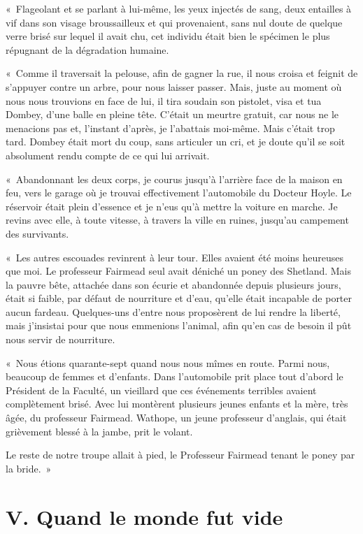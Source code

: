 \documentclass[french,twoside]{book} %
\newcommand\chapteropen{} %
\newcommand\chapterclose{} %
\begin{document}
« Flageolant et se parlant à lui-même, les yeux injectés de sang, deux entailles à vif dans son visage broussailleux et qui provenaient, sans nul doute de quelque verre brisé sur lequel il avait chu, cet individu était bien le spécimen le plus répugnant de la dégradation humaine.\par
« Comme il traversait la pelouse, afin de gagner la rue, il nous croisa et feignit de s’appuyer contre un arbre, pour nous laisser passer. Mais, juste au moment où nous nous trouvions en face de lui, il tira soudain son pistolet, visa et tua Dombey, d’une balle en pleine tête. C’était un meurtre gratuit, car nous ne le menacions pas et, l’instant d’après, je l’abattais moi-même. Mais c’était trop tard. Dombey était mort du coup, sans articuler un cri, et je doute qu’il se soit absolument rendu compte de ce qui lui arrivait.\par
« Abandonnant les deux corps, je courus jusqu’à l’arrière face de la maison en feu, vers le garage où je trouvai effectivement l’automobile du Docteur Hoyle. Le réservoir était plein d’essence et je n’eus qu’à mettre la voiture en marche. Je revins avec elle, à toute vitesse, à travers la ville en ruines, jusqu’au campement des survivants.\par
« Les autres escouades revinrent à leur tour. Elles avaient été moins heureuses que moi. Le professeur Fairmead seul avait déniché un poney des Shetland. Mais la pauvre bête, attachée dans son écurie et abandonnée depuis plusieurs jours, était si faible, par défaut de nourriture et d’eau, qu’elle était incapable de porter aucun fardeau. Quelques-uns d’entre nous proposèrent de lui rendre la liberté, mais j’insistai pour que nous emmenions l’animal, afin qu’en cas de besoin il pût nous servir de nourriture.\par
« Nous étions quarante-sept quand nous nous mîmes en route. Parmi nous, beaucoup de femmes et d’enfants. Dans l’automobile prit place tout d’abord le Président de la Faculté, un vieillard que ces événements terribles avaient complètement brisé. Avec lui montèrent plusieurs jeunes enfants et la mère, très âgée, du professeur Fairmead. Wathope, un jeune professeur d’anglais, qui était grièvement blessé à la jambe, prit le volant.\par
Le reste de notre troupe allait à pied, le Professeur Fairmead tenant le poney par la bride. »
\chapterclose


\chapteropen

\chapter[{V. Quand le monde fut vide}]{V. Quand le monde fut vide}
\renewcommand{\leftmark}{V. Quand le monde fut vide}
\end{document}
